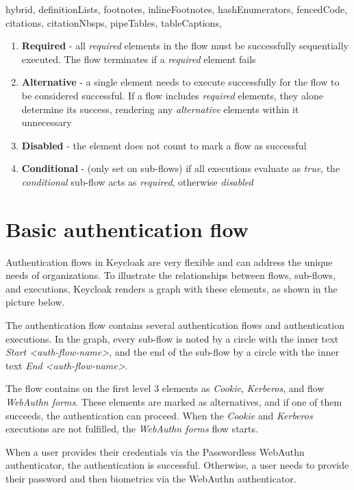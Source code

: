\documentclass[
  digital,     %
  oneside,     %
  nosansbold,  %
  nocolorbold, %
  lof,         %
  lot,         %
]{fithesis4}
\begin{document}
\begin{markdown*}{%
  hybrid,
  definitionLists,
  footnotes,
  inlineFootnotes,
  hashEnumerators,
  fencedCode,
  citations,
  citationNbsps,
  pipeTables,
  tableCaptions,
}
\begin{enumerate}
    \item \textbf{Required} - all \textit{required} elements in the flow must be successfully sequentially executed. The flow terminates if a \textit{required} element fails
    \item \textbf{Alternative} - a single element needs to execute successfully for the flow to be considered successful. If a flow includes \textit{required} elements, they alone determine its success, rendering any \textit{alternative} elements within it unnecessary
    \item \textbf{Disabled} - the element does not count to mark a flow as successful
    \item \textbf{Conditional} - (only set on sub-flows) if all executions evaluate as \textit{true}, the \textit{conditional} sub-flow acts as \textit{required}, otherwise \textit{disabled}
\end{enumerate}

\newpage

\section{Basic authentication flow}
Authentication flows in Keycloak are very flexible and can address the unique needs of organizations.
To illustrate the relationships between flows, sub-flows, and executions, Keycloak renders a graph with these elements, as shown in the picture below.

The authentication flow contains several authentication flows and authentication executions.
In the graph, every sub-flow is noted by a circle with the inner text \textit{Start <auth-flow-name>}, and the end of the sub-flow by a circle with the inner text \textit{End <auth-flow-name>}.

The flow contains on the first level 3 elements as \textit{Cookie}, \textit{Kerberos}, and flow \textit{WebAuthn forms}.
These elements are marked as alternatives, and if one of them succeeds, the authentication can proceed.
When the \textit{Cookie} and \textit{Kerberos} executions are not fulfilled, the \textit{WebAuthn forms} flow starts.

When a user provides their credentials via the Passwordless WebAuthn authenticator, the authentication is successful.
Otherwise, a user needs to provide their password and then biometrics via the WebAuthn authenticator.


\end{markdown*}
\end{document}
